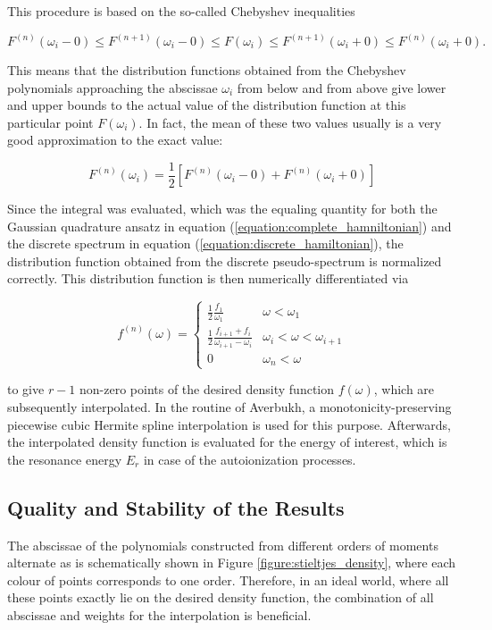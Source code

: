 This procedure is based on the so-called Chebyshev inequalities

\begin{equation} \label{equation:Chebyshev_inequalities}
  F^{(n)}(\omega_i - 0) \le F^{(n+1)}(\omega_i - 0) \le F(\omega_i)
  \le F^{(n+1)}(\omega_i + 0) \le F^{(n)}(\omega_i + 0).
\end{equation}

This means that the distribution functions obtained from the Chebyshev
polynomials approaching the abscissae $\omega_i$ from below and from above
give lower and upper bounds to the actual value of the distribution
function at this particular point $F(\omega_i)$. In fact, the mean of these
two values usually is a very good approximation to the exact value:

\begin{equation}
  F^{(n)} (\omega_i) = \frac 12 \left[ F^{(n)} (\omega_i - 0)
                       + F^{(n)} (\omega_i+0) \right]
\end{equation}

Since the integral was evaluated,
which was the equaling quantity for both the Gaussian quadrature ansatz
in equation (\ref{equation:complete_hamniltonian}) and the discrete spectrum in equation
(\ref{equation:discrete_hamiltonian}), the distribution function obtained from the
discrete pseudo-spectrum is normalized correctly.
This distribution function is then numerically differentiated via

\begin{equation}
  f^{(n)} (\omega) =
  \begin{cases}
    \frac 12 \frac{f_1}{\omega_1}    & \omega < \omega_1\\
    \frac 12 \frac{f_{i+1} + f_i}{\omega_{i+1} - \omega_i}
                                     & \omega_i < \omega < \omega_{i+1}\\
    0                                & \omega_n < \omega
  \end{cases}
\end{equation}

to give  $r-1$ non-zero points of the desired
density function $f(\omega)$, which are
subsequently interpolated. In the routine of Averbukh, a 
monotonicity-preserving piecewise cubic Hermite spline interpolation
is used for this purpose. Afterwards, the interpolated density function is evaluated
for the energy of interest, which is the resonance energy $E_r$ in case of the
autoionization processes.

\subsection{Quality and Stability of the Results} \label{section:quality_stieltjes}
The abscissae of the polynomials constructed from different orders
of moments alternate as is schematically shown in
Figure \ref{figure:stieltjes_density}, where each colour of points corresponds
to one order. Therefore, in an ideal world, where all these points exactly lie
on the desired density function, the combination of all abscissae
and weights for the interpolation is beneficial.

